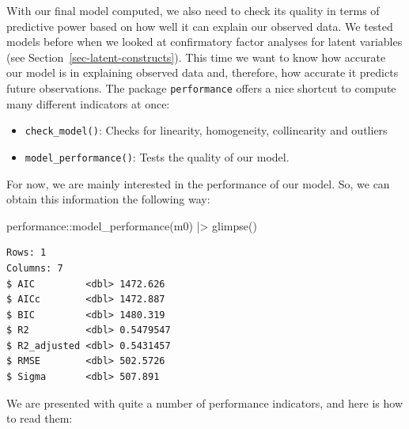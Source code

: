\documentclass[
  letterpaper,
  DIV=11,
  numbers=noendperiod]{scrreprt}
\newenvironment{Shaded}{\begin{snugshade}}{\end{snugshade}}
\newcommand{\FunctionTok}[1]{\textcolor[rgb]{0.28,0.35,0.67}{#1}}
\newcommand{\NormalTok}[1]{\textcolor[rgb]{0.00,0.23,0.31}{#1}}
\newcommand{\SpecialCharTok}[1]{\textcolor[rgb]{0.37,0.37,0.37}{#1}}
\begin{document}
With our final model computed, we also need to check its quality in
terms of predictive power based on how well it can explain our observed
data. We tested models before when we looked at confirmatory factor
analyses for latent variables (see Section~\ref{sec-latent-constructs}).
This time we want to know how accurate our model is in explaining
observed data and, therefore, how accurate it predicts future
observations. The package \texttt{performance} offers a nice shortcut to
compute many different indicators at once:

\begin{itemize}
\item
  \texttt{check\_model()}: Checks for linearity, homogeneity,
  collinearity and outliers
\item
  \texttt{model\_performance()}: Tests the quality of our model.
\end{itemize}

For now, we are mainly interested in the performance of our model. So,
we can obtain this information the following way:

\begin{Shaded}
\begin{Highlighting}[]
\NormalTok{performance}\SpecialCharTok{::}\FunctionTok{model\_performance}\NormalTok{(m0) }\SpecialCharTok{|\textgreater{}}
  \FunctionTok{glimpse}\NormalTok{()}
\end{Highlighting}
\end{Shaded}

\begin{verbatim}
Rows: 1
Columns: 7
$ AIC         <dbl> 1472.626
$ AICc        <dbl> 1472.887
$ BIC         <dbl> 1480.319
$ R2          <dbl> 0.5479547
$ R2_adjusted <dbl> 0.5431457
$ RMSE        <dbl> 502.5726
$ Sigma       <dbl> 507.891
\end{verbatim}

We are presented with quite a number of performance indicators, and here
is how to read them:
\end{document}
